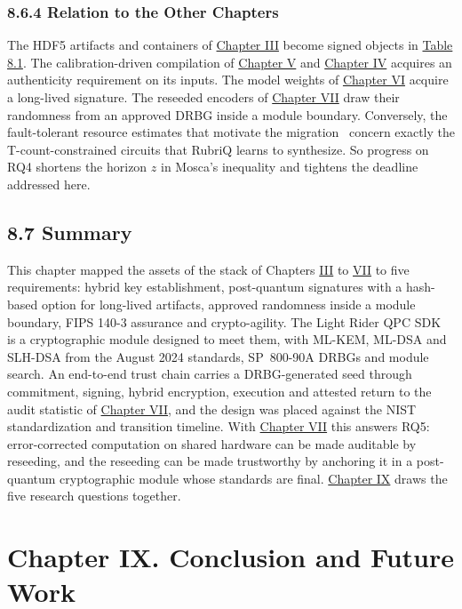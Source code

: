 \documentclass{report}
\theoremstyle{plain}
\theoremstyle{definition}
\theoremstyle{remark}
\begin{document}
\subsection{8.6.4 Relation to the Other Chapters}\label{sec:pqc:relation}

The HDF5 artifacts and containers of \hyperref[ch:qgear]{Chapter III} become signed objects in \hyperref[tab:pqc:assets]{Table 8.1}. The calibration-driven compilation of \hyperref[ch:nisq]{Chapter V} and \hyperref[ch:qml]{Chapter IV} acquires an authenticity requirement on its inputs. The model weights of \hyperref[ch:synthesis]{Chapter VI} acquire a long-lived signature. The reseeded encoders of \hyperref[ch:qec]{Chapter VII} draw their randomness from an approved DRBG inside a module boundary. Conversely, the fault-tolerant resource estimates that motivate the migration~\cite{gidney2021rsa,gidney2025million} concern exactly the T-count-constrained circuits that RubriQ learns to synthesize. So progress on RQ4 shortens the horizon $z$ in Mosca's inequality and tightens the deadline addressed here.

\section{8.7 Summary}\label{sec:pqc:summary}

This chapter mapped the assets of the stack of Chapters \hyperref[ch:qgear]{III} to \hyperref[ch:qec]{VII} to five requirements: hybrid key establishment, post-quantum signatures with a hash-based option for long-lived artifacts, approved randomness inside a module boundary, FIPS 140-3 assurance and crypto-agility. The Light Rider QPC SDK~\cite{guo2026lightriderqpc} is a cryptographic module designed to meet them, with ML-KEM, ML-DSA and SLH-DSA from the August 2024 standards, SP~800-90A DRBGs and module search. An end-to-end trust chain carries a DRBG-generated seed through commitment, signing, hybrid encryption, execution and attested return to the audit statistic of \hyperref[ch:qec]{Chapter VII}, and the design was placed against the NIST standardization and transition timeline. With \hyperref[ch:qec]{Chapter VII} this answers RQ5: error-corrected computation on shared hardware can be made auditable by reseeding, and the reseeding can be made trustworthy by anchoring it in a post-quantum cryptographic module whose standards are final. \hyperref[ch:conclusion]{Chapter IX} draws the five research questions together.


\chapter{Chapter IX. Conclusion and Future Work}\label{ch:conclusion}
\end{document}
